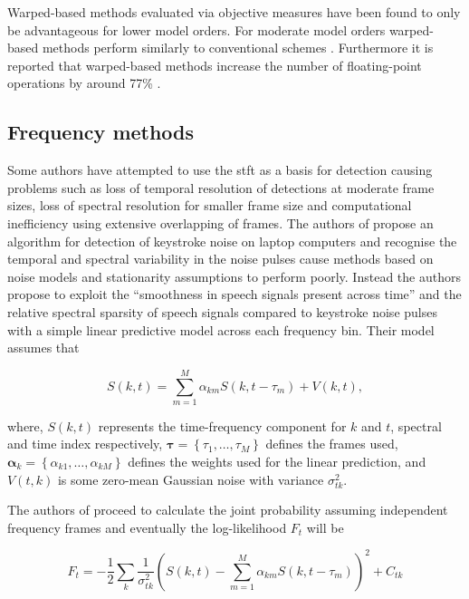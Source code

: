 Warped-based methods evaluated via objective measures have been found to only be advantageous for lower model orders. For moderate model orders warped-based methods perform similarly to conventional schemes \cite{Esquef2003}\cite{Esquef2003a}. Furthermore it is reported that warped-based methods increase the number of floating-point operations by around 77\% \cite{Esquef2003}.

\subsection{Frequency methods}
 Some authors have attempted to use the \DIFdelbegin {}\DIFdelend \DIFaddbegin \gls{stft} \DIFaddend as a basis for detection \cite{Czyzewski1995}\cite{Subramanya2007}\cite{Sugiyama2007}\cite{Abramson2007} causing problems such as loss of temporal resolution of detections at moderate frame sizes, loss of spectral resolution for smaller frame size and computational inefficiency using extensive overlapping of frames. The authors of \cite{Subramanya2007} propose an algorithm for detection of keystroke noise on laptop computers and recognise the temporal and spectral variability in the noise pulses cause methods based on noise models and stationarity assumptions to perform poorly. Instead the authors propose to exploit the ``smoothness in speech signals present across time'' and the relative spectral sparsity of speech signals compared to keystroke noise pulses with a simple linear predictive model across each frequency bin. Their model assumes that

\begin{equation}
\label{eq:Subramanya2007}
S(k,t) = \sum_{m=1}^M \alpha_{km} S(k,t - \tau_m) + V(k,t),
\end{equation}

where, $S(k,t)$ represents the time-frequency component for $k$ and $t$, spectral and time index respectively, $\boldsymbol{\tau} = \left\{\tau_1, \ldots ,\tau_M \right\}$ defines the frames used, \linebreak[2]$\boldsymbol{\alpha}_k = \left\{\alpha_{k1},\ldots,\alpha_{kM} \right\}$ defines the weights used for the linear prediction, and $V(t,k)$ is some zero-mean Gaussian noise with variance $\sigma^2_{tk}$.

The authors of \cite{Subramanya2007} proceed to calculate the joint probability assuming independent frequency frames and eventually the log-likelihood $F_t$ will be

\begin{equation}
\label{eq:Subramanya2007_2}
F_t = - \frac{1}{2} \sum_k \frac{1}{\sigma^2_{tk}} \left( S\left(k,t\right) - \sum_{m=1}^M \alpha_{km} S(k,t-\tau_m)\right)^2 + C_{tk}
\end{equation}

